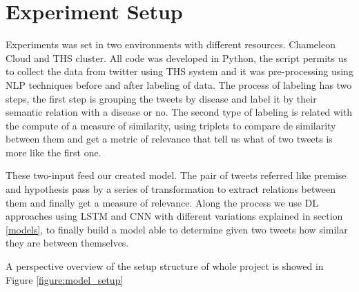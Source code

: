 \documentclass[12pt]{report}
\begin{document}
\section{Experiment Setup}
Experiments was set in two environments with different resources. Chameleon Cloud and \ac{THS} cluster. All code was developed in Python, the script permits us to collect the data from twitter using \ac{THS} system and it was pre-processing using \ac{NLP} techniques before and after labeling of data. The process of labeling has two steps, the first step is grouping the tweets by disease and label it by their semantic relation with a disease or no. The second type of labeling is related with the compute of a measure of similarity, using triplets to compare de similarity between them and get a metric of relevance that tell us what of two tweets is more like the first one.

These two-input feed our created model. The pair of tweets referred like premise and hypothesis pass by a series of transformation to extract relations between them and finally get a measure of relevance. Along the process we use \ac{DL} approaches using \ac{LSTM} and \ac{CNN} with different variations explained in section \ref{models}, to finally build a model able to determine given two tweets how similar they are between themselves.

A perspective overview of the setup structure of whole project is showed in Figure \ref{figure:model_setup}
\end{document}
